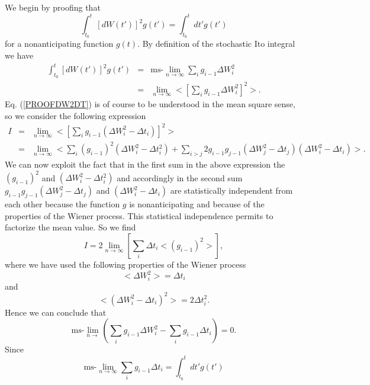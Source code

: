 We begin by proofing that
\begin{equation}
\label{PROOFDW2DT}
\int_{t_0}^t \left[ dW(t') \right]^2 g(t') = \int_{t_0}^t dt' 
g(t')
\end{equation}
for a nonanticipating function $g(t)$. By definition of the 
stochastic Ito integral we have
\begin{eqnarray*}
\int_{t_0}^t \left[ dW(t') \right]^2 g(t') & = & 
\text{ms-}\lim_{n \rightarrow \infty} \sum_i g_{i-1} \Delta W_i^2 \\
   & = & \lim_{n \rightarrow \infty} 
    < \left[ \sum_i g_{i-1} \Delta W_i^2 \right]^2>.
\end{eqnarray*}
Eq. (\ref{PROOFDW2DT}) is of course to be understood in the mean
square sense, so we consider the following expression
\begin{eqnarray*}
I & = & \lim_{n \rightarrow \infty} 
< \left[ \sum_i g_{i-1} (\Delta W_i^2  -\Delta t_i)\right]^2   > 
\\
& = & \lim_{n \rightarrow \infty} 
<  \sum_i (g_{i-1})^2 (\Delta W_i^2  -\Delta t_i^2)
+\sum_{i>j} 2 g_{i-1}g_{j-1} (\Delta W_j^2  -\Delta t_j)
 (\Delta W_i^2  -\Delta t_i) >.
\end{eqnarray*}
We can now exploit the fact that in the first sum in the above expression
the $(g_{i-1})^2$ and $(\Delta W_i^2  -\Delta t_i^2)$ and accordingly in the 
second sum $g_{i-1}g_{j-1} (\Delta W_j^2  -\Delta t_j)$ and 
$(\Delta W_i^2  -\Delta t_i)$ are statistically independent from 
each other because the function $g$ is nonanticipating and because 
of the properties of the Wiener process. This statistical 
independence permits to factorize the mean value. So we find
\begin{equation*}
I = 2 \lim_{n \rightarrow \infty} 
\left[ \sum_i \Delta t_i <(g_{i-1})^2> \right],
\end{equation*}
where we have used the following properties of the Wiener process
\begin{equation*}
<\Delta W_i^2> = \Delta t_i
\end{equation*}
and
\begin{equation*}
<(\Delta W_i^2 - \Delta t_i)^2> = 2 \Delta t_i^2.
\end{equation*}
Hence we can conclude that
\begin{equation*}
\text{ms-}\lim_{n \rightarrow} 
\left( \sum_i g_{i-1} \Delta W_i^2 - \sum_i g_{i-1} \Delta t_i \right)
=0.
\end{equation*}
Since 
\begin{equation*}
\text{ms-}\lim_{n\rightarrow \infty} \sum_i g_{i-1} \Delta t_i =
\int_{t_0}^t dt' g(t')
\end{equation*}
